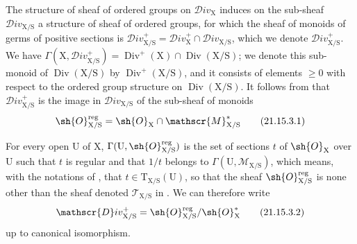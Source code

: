 \begin{env}[21.15.3]
\label{IV.21.15.3}
The structure of sheaf of ordered groups on $\mathscr{D}iv_{\mathrm{X}}$  induces on the sub-sheaf $\mathscr{D}iv_{\mathrm{X}/\mathrm{S}}$ a structure of sheaf of ordered groups, for which the sheaf of monoids of germs of positive sections is $\mathscr{D}iv_{\mathrm{X}/\mathrm{S}}^+=\mathscr{D}iv_{\mathrm{X}}^+\cap\mathscr{D}iv_{\mathrm{X}/\mathrm{S}}$, which we denote $\mathscr{D}iv_{\mathrm{X}/\mathrm{S}}^+$.
We have $\Gamma(\mathrm{X},\mathscr{D}iv_{\mathrm{X}/\mathrm{S}}^+)=\operatorname{Div}^+(\mathrm{X})\cap\operatorname{Div}(\mathrm{X}/\mathrm{S})$; we denote this sub-monoid of $\operatorname{Div}(\mathrm{X}/\mathrm{S})$ by $\operatorname{Div}^+(\mathrm{X}/\mathrm{S})$, and it consists of elements $\geq 0$ with respect to the ordered group structure on $\operatorname{Div}(\mathrm{X}/\mathrm{S})$.
It follows from  that $\mathscr{D}iv_{\mathrm{X}/\mathrm{S}}^+$ is the image in $\mathscr{D}iv_{\mathrm{X}/\mathrm{S}}$ of the sub-sheaf of monoids
\[
\label{IV.21.15.3.1}
  \sh{O}_{\mathrm{X}/\mathrm{S}}^{\operatorname{reg}}=\sh{O}_{\mathrm{X}}\cap\mathscr{M}_{\mathrm{X}/\mathrm{S}}^*
  \tag{21.15.3.1}
\]
\end{env}

For every open $\mathrm{U}$ of $\mathrm{X}$, $\Gamma(\mathrm{U},\sh{O}_{\mathrm{X}/\mathrm{S}}^{\operatorname{reg}})$ is the set of sections $t$ of $\sh{O}_{\mathrm{X}}$ over $\mathrm{U}$ such that $t$ is regular and that $1/t$ belongs to $\Gamma(\mathrm{U},\mathscr{M}_{\mathrm{X}/\mathrm{S}})$, which means, with the notations of , that $t\in\mathrm{T}_{\mathrm{X}/\mathrm{S}}(\mathrm{U})$, so that the sheaf $\sh{O}_{\mathrm{X}/\mathrm{S}}^{\operatorname{reg}}$ is none other than the sheaf denoted $\mathscr{T}_{\mathrm{X}/\mathrm{S}}$ in .
We can therefore write
\[
\label{IV.21.15.3.2}
  \mathscr{D}iv_{\mathrm{X}/\mathrm{S}}^+=\sh{O}_{\mathrm{X}/\mathrm{S}}^{\operatorname{reg}}/\sh{O}_{\mathrm{X}}^*
  \tag{21.15.3.2}
\]
up to canonical isomorphism.

